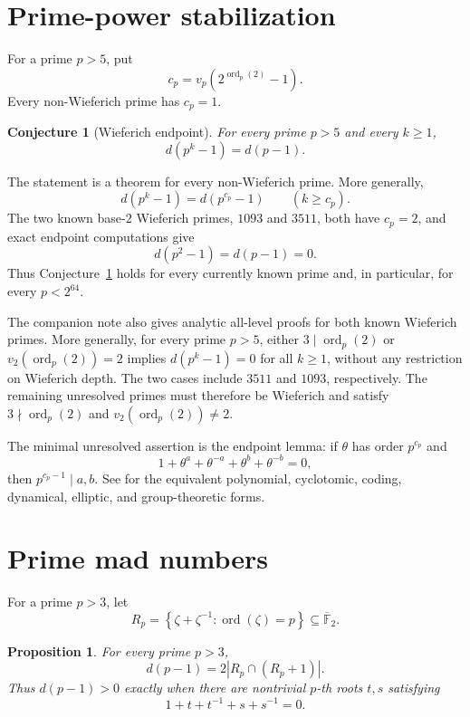 \documentclass[a4paper]{article}
\newtheorem{proposition}[theorem]{Proposition}
\newtheorem{conjecture}[theorem]{Conjecture}
\newcommand{\F}{\mathbb{F}}
\newcommand{\abs}[1]{\left|#1\right|}
\begin{document}
\section{Prime-power stabilization}

For a prime $p>5$, put
\[
	c_p=v_p\!\left(2^{\operatorname{ord}_p(2)}-1\right).
\]
Every non-Wieferich prime has $c_p=1$.

\begin{conjecture}[Wieferich endpoint]\label{conj:prime-power}
	For every prime $p>5$ and every $k\geq1$,
	\[
		d(p^k-1)=d(p-1).
	\]
\end{conjecture}

The statement is a theorem for every non-Wieferich prime.  More generally,
\[
	d(p^k-1)=d(p^{c_p}-1)\qquad(k\geq c_p).
\]
The two known base-$2$ Wieferich primes, $1093$ and $3511$, both have
$c_p=2$, and exact endpoint computations give
\[
	d(p^2-1)=d(p-1)=0.
\]
Thus Conjecture~\ref{conj:prime-power} holds for every currently known
prime and, in particular, for every $p<2^{64}$.

The companion note
also gives analytic all-level proofs for both known Wieferich primes.
More generally, for every prime $p>5$, either
$3\mid\operatorname{ord}_p(2)$ or
$v_2(\operatorname{ord}_p(2))=2$ implies
$d(p^k-1)=0$ for all $k\geq1$, without any restriction on Wieferich
depth.  The two cases include $3511$ and $1093$, respectively.
The remaining unresolved primes must therefore be Wieferich and satisfy
$3\nmid\operatorname{ord}_p(2)$ and
$v_2(\operatorname{ord}_p(2))\ne2$.

The minimal unresolved assertion is the endpoint lemma: if $\theta$ has
order $p^{c_p}$ and
\[
	1+\theta^a+\theta^{-a}+\theta^b+\theta^{-b}=0,
\]
then $p^{c_p-1}\mid a,b$.  See
 for the equivalent
polynomial, cyclotomic, coding, dynamical, elliptic, and group-theoretic
forms.

\section{Prime mad numbers}

For a prime $p>3$, let
\[
	R_p=
	\left\{\zeta+\zeta^{-1}:
	\operatorname{ord}(\zeta)=p\right\}
	\subseteq\overline{\F}_2.
\]

\begin{proposition}\label{prop:prime-mad}
	For every prime $p>3$,
	\[
		d(p-1)=2\abs{R_p\cap(R_p+1)}.
	\]
	Thus $d(p-1)>0$ exactly when there are nontrivial $p$-th roots
	$t,s$ satisfying
	\[
		1+t+t^{-1}+s+s^{-1}=0.
	\]
\end{proposition}
\end{document}
